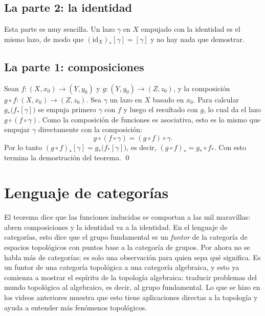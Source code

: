 \documentclass[11pt]{article}
\begin{document}
\subsection*{La parte 2: la identidad}

Esta parte es muy sencilla. Un lazo $\gamma$ en $X$ empujado con la identidad es el mismo lazo, de modo que $(\mathrm{id}_X)_*[\gamma]=[\gamma]$ y no hay nada que demostrar.

\subsection*{La parte 1: composiciones}

Sean $f\colon(X,x_0)\to(Y,y_0)$ y $g\colon(Y,y_0)\to(Z,z_0)$, y la composición $g\circ f\colon (X,x_0)\to(Z,z_0)$. Sea $\gamma$ un lazo en $X$ basado en $x_0$. Para calcular $g_*\bigl(f_*[\gamma]\bigr)$ se empuja primero $\gamma$ con $f$ y luego el resultado con $g$, lo cual da el lazo $g\circ(f\circ\gamma)$. Como la composición de funciones es asociativa, esto es lo mismo que empujar $\gamma$ directamente con la composición:
\[
  g\circ(f\circ\gamma)=(g\circ f)\circ\gamma.
\]
Por lo tanto $(g\circ f)_*[\gamma]=g_*\bigl(f_*[\gamma]\bigr)$, es decir, $(g\circ f)_*=g_*\circ f_*$. Con esto termina la demostración del teorema. \qed

\section*{Lenguaje de categorías}

El teorema dice que las funciones inducidas se comportan a las mil maravillas: abren composiciones y la identidad va a la identidad. En el lenguaje de categorías, esto dice que el grupo fundamental es un \emph{funtor} de la categoría de espacios topológicos con puntos base a la categoría de grupos. Por ahora no se habla más de categorías; es solo una observación para quien sepa qué significa. Es un funtor de una categoría topológica a una categoría algebraica, y esto ya comienza a mostrar el espíritu de la topología algebraica: traducir problemas del mundo topológico al algebraico, es decir, al grupo fundamental. Lo que se hizo en los videos anteriores muestra que esto tiene aplicaciones directas a la topología y ayuda a entender más fenómenos topológicos.
\end{document}
